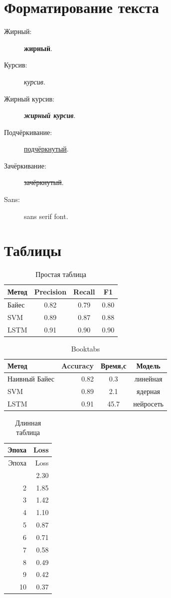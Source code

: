 \documentclass[font=modern]{cmcmsuthesis-bachelor}
\begin{document}
\section{Форматирование текста}
\begin{description}
\item[Жирный:] \textbf{жирный}.\item[Курсив:] \emph{курсив}.
\item[Жирный курсив:] \textbf{\emph{жирный курсив}}.
\item[Подчёркивание:] \underline{подчёркнутый}.
\item[Зачёркивание:] \sout{зачёркнутый}.
\item[Sans:] \textsf{sans serif font}.
\end{description}

\section{Таблицы}

\begin{table}[htbp]\caption{Простая таблица}\label{tab:simple}\centering
\begin{tabular}{|l|c|c|c|}\hline Метод&Precision&Recall&F1\\\hline
Байес&0.82&0.79&0.80\\\hline SVM&0.89&0.87&0.88\\\hline
LSTM&0.91&0.90&0.90\\\hline\end{tabular}\end{table}

\begin{table}[htbp]\caption{Booktabs}\label{tab:booktabs}\centering
\begin{tabular}{lrcc}\toprule
\textbf{Метод}&\textbf{Accuracy}&\textbf{Время,с}&\textbf{Модель}\\\midrule
Наивный Байес&0.82&0.3&линейная\\
SVM&0.89&2.1&ядерная\\
LSTM&0.91&45.7&нейросеть\\\bottomrule\end{tabular}\end{table}

\begin{longtable}{@{}rr@{}}\caption{Длинная таблица}\label{tab:long}\\
\toprule Эпоха&Loss\\\midrule\endfirsthead
\toprule Эпоха&Loss\\\midrule\endhead\bottomrule\endfoot
1&2.30\\2&1.85\\3&1.42\\4&1.10\\5&0.87\\
6&0.71\\7&0.58\\8&0.49\\9&0.42\\10&0.37\\\end{longtable}
\end{document}

